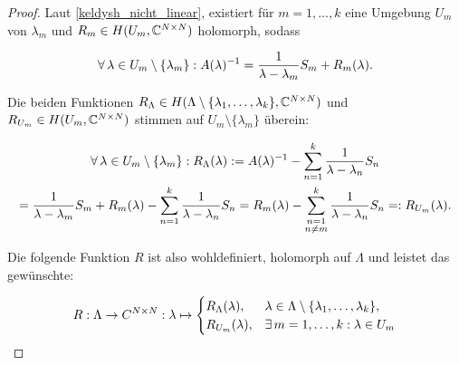 \begin{proof}

    Laut \ref{keldysh_nicht_linear}, existiert für $m = 1, \dots, k$ eine Umgebung $U_m$ von $\lambda_m$ und $R_m \in H(U_m, \mathbb{C}^{N \times N})$ holomorph, sodass

    \begin{align*}
        \forall \, \lambda \in U_m \setminus {\left \{ \lambda_m \right \}}:
            A(\lambda)^{-1}
            =
            \frac{1}{\lambda - \lambda_m} S_m
            +
            R_m(\lambda).
    \end{align*}

    Die beiden Funktionen $R_\Lambda \in H(\Lambda \setminus {\left \{ \lambda_1, \dots, \lambda_k \right \}}, \mathbb{C}^{N \times N})$ und $R_{U_m} \in H(U_m, \mathbb{C}^{N \times N})$ stimmen auf $U_m \setminus \{\lambda_m\}$ überein:

    \begin{multline*}
        \forall \, \lambda \in U_m \setminus {\left \{ \lambda_m \right \}}:
            R_\Lambda(\lambda)
            :=
            A(\lambda)^{-1}
            -
            \sum_{n=1}^k
                \frac{1}{\lambda - \lambda_n} S_n \\
            =
            \frac{1}{\lambda - \lambda_m} S_m
            +
            R_m(\lambda)
            -
            \sum_{n=1}^k
                \frac{1}{\lambda - \lambda_n} S_n
            =
            R_m(\lambda)
            -
            \sum_{\substack{n = 1 \\ n \neq m}}^k
                \frac{1}{\lambda - \lambda_n} S_n
            =:
            R_{U_m}(\lambda).
    \end{multline*}

    Die folgende Funktion $R$ ist also wohldefiniert, holomorph auf $\Lambda$ und leistet das gewünschte:

    \begin{align*}
        R:
        \Lambda \to C^{N \times N}:
        \lambda
        \mapsto
        \begin{cases}
            R_\Lambda(\lambda), & \lambda \in \Lambda \setminus {\left \{ \lambda_1, \dots, \lambda_k \right \}}, \\
            R_{U_m}(\lambda),   & \exists \, m = 1, \dots, k: \lambda \in U_m
        \end{cases}
    \end{align*}

\end{proof}
